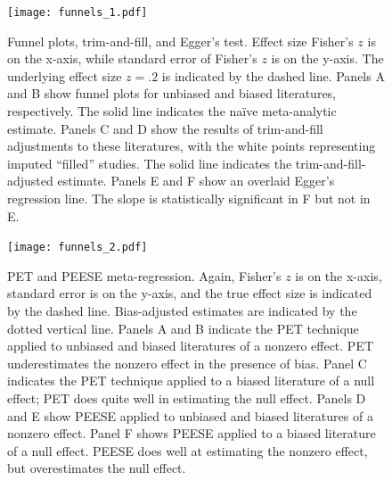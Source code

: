 \documentclass[man]{apa6}
\begin{document}


\newpage



\begin{figure}
	\texttt{[image: funnels\_1.pdf]}
	\caption{Funnel plots, trim-and-fill, and Egger's test. Effect size Fisher's $z$ is on the x-axis, while standard error of Fisher's $z$ is on the y-axis. The underlying effect size $z = .2$ is indicated by the dashed line. Panels A and B show funnel plots for unbiased and biased literatures, respectively. The solid line indicates the na{\"i}ve meta-analytic estimate. Panels C and D show the results of trim-and-fill adjustments to these literatures, with the white points representing imputed ``filled'' studies. The solid line indicates the trim-and-fill-adjusted estimate. Panels E and F show an overlaid Egger's regression line. The slope is statistically significant in F but not in E.}
	\label{funnels1}
\end{figure}

\begin{figure}
	\texttt{[image: funnels\_2.pdf]}
	\caption{PET and PEESE meta-regression. Again, Fisher's $z$ is on the x-axis, standard error is on the y-axis, and the true effect size is indicated by the dashed line. Bias-adjusted estimates are indicated by the dotted vertical line. Panels A and B indicate the PET technique applied to unbiased and biased literatures of a nonzero effect. PET underestimates the nonzero effect in the presence of bias. Panel C indicates the PET technique applied to a biased literature of a null effect; PET does quite well in estimating the null effect. Panels D and E show PEESE applied to unbiased and biased literatures of a nonzero effect. Panel F shows PEESE applied to a biased literature of a null effect. PEESE does well at estimating the nonzero effect, but overestimates the null effect.}
	\label{funnels2}
\end{figure}
\end{document}
